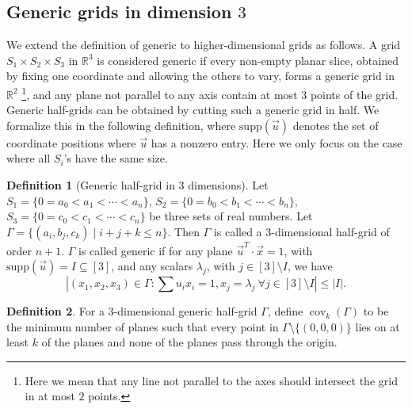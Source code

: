\documentclass[usenames,dvipsnames, 11pt]{article}
\numberwithin{thm}{section}
\theoremstyle{definition}
\newtheorem{mydef}{Definition}
\theoremstyle{definition}
\theoremstyle{definition}
\newcommand{\cov}[1]{\operatorname{cov}_{#1}}
\newcommand{\1}{\mathbf{1}}
\begin{document}
\subsection{Generic grids in dimension $3$}

We extend the definition of generic to higher-dimensional grids as follows. A grid $S_1 \times S_2 \times S_3$ in $\mathbb{R}^3$ is considered generic if every non-empty planar slice, obtained by fixing one coordinate and allowing the others to vary, forms a generic grid in $\mathbb{R}^2$ \footnote{Here we mean that any line not parallel to the axes should intersect the grid in at most $2$ points.}, and any plane not parallel to any axis contain at most $3$ points of the grid. 
Generic half-grids can be obtained by cutting such a generic grid in half. 
We formalize this in the following definition, where $\mathrm{supp}(\vec{u})$ denotes the set of coordinate positions where $\vec{u}$ has a nonzero entry.
Here we only focus on the case where all $S_i$'s have the same size.


\begin{mydef}[Generic half-grid in 3 dimensions]
    Let $S_1=\{0=a_0<a_1<\cdots<a_n\}$, $S_2=\{0=b_0<b_1<\cdots<b_n\}$, $S_3=\{0=c_0<c_1<\cdots<c_n\}$ be three sets of real numbers. Let $\Gamma=\{(a_i,b_j,c_k) \mid i+j+k \leq n\}$. Then $\Gamma$ is called a 3-dimensional half-grid of order $n+1$. 
    $\Gamma$ is called generic if for any plane $\vec{u}^T \cdot \vec{x} = 1$, with $\mathrm{supp}(\vec{u}) = I \subseteq [3]$, and any scalars $\lambda_j$, with $j \in [3] \setminus I$, we have 
    \[\left| (x_1, x_2, x_3) \in \Gamma : \sum u_i x_i = 1, x_j = \lambda_j~\forall j \in [3] \setminus I \right| \leq |I|.\]
\end{mydef}

\begin{mydef}
    For a 3-dimensional generic half-grid $\Gamma$, define $\cov{k}(\Gamma)$ to be the minimum number of planes such that every point in $\Gamma \setminus \{(0,0,0)\}$ lies on at least $k$ of the planes and none of the planes pass through the origin. 
\end{mydef}
\end{document}
